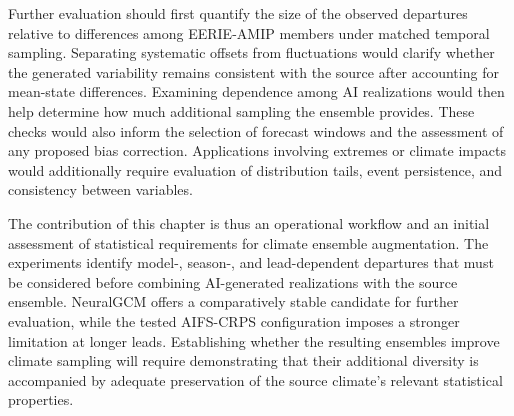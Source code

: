 Further evaluation should first quantify the size of the observed departures relative to differences among EERIE-AMIP members under matched temporal sampling. Separating systematic offsets from fluctuations would clarify whether the generated variability remains consistent with the source after accounting for mean-state differences. Examining dependence among AI realizations would then help determine how much additional sampling the ensemble provides. These checks would also inform the selection of forecast windows and the assessment of any proposed bias correction. Applications involving extremes or climate impacts would additionally require evaluation of distribution tails, event persistence, and consistency between variables.

The contribution of this chapter is thus an operational workflow and an initial assessment of statistical requirements for climate ensemble augmentation. The experiments identify model-, season-, and lead-dependent departures that must be considered before combining AI-generated realizations with the source ensemble. NeuralGCM offers a comparatively stable candidate for further evaluation, while the tested AIFS-CRPS configuration imposes a stronger limitation at longer leads. Establishing whether the resulting ensembles improve climate sampling will require demonstrating that their additional diversity is accompanied by adequate preservation of the source climate's relevant statistical properties.